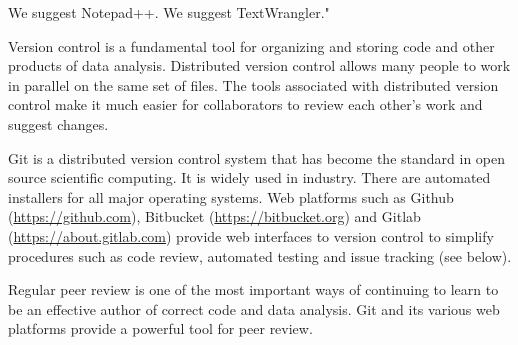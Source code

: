 We suggest Notepad++.
We suggest TextWrangler."


Version control is a fundamental tool for organizing and storing code and
other products of data analysis.  Distributed version control allows many
people to work in parallel on the same set of files.  The tools associated
with distributed version control make it much easier for collaborators to
review each other's work and suggest changes.

Git is a distributed version control system that has become the standard in
open source scientific computing. It is widely used in industry.  There are
automated installers for all major operating systems.  Web platforms such as
Github (\url{https://github.com}), Bitbucket (\url{https://bitbucket.org}) and
Gitlab (\url{https://about.gitlab.com}) provide web interfaces to version
control to simplify procedures such as code review, automated testing and
issue tracking (see below).



Regular peer review is one of the most important ways of continuing to learn
to be an effective author of correct code and data analysis.  Git and its
various web platforms provide a powerful tool for peer review.

